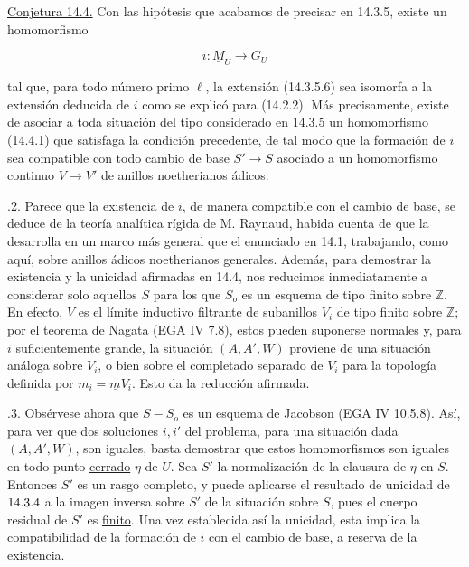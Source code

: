 
\par\medskip
\noindent
\underline{Conjetura 14.4.} Con las hipótesis que acabamos de precisar
en 14.3.5, existe un homomorfismo

\begin{equation}\tag{14.4.1}
 i:\underline M_U\longrightarrow G_U
\end{equation}

\noindent
tal que, para todo número primo $\ell$, la extensión (14.3.5.6) sea
isomorfa a la extensión deducida de $i$ como se explicó para (14.2.2).
Más precisamente, existe  de asociar a toda situación del tipo considerado en 14.3.5 un
homomorfismo (14.4.1) que satisfaga la condición precedente, de tal modo
que la formación de $i$ sea compatible con todo cambio de base
$S'\longrightarrow S$ asociado a un homomorfismo continuo
$V\longrightarrow V'$ de anillos noetherianos ádicos.

\medskip
{}.2. Parece que la existencia de $i$, de manera compatible con el
cambio de base, se deduce de la teoría analítica rígida de M. Raynaud,
habida cuenta de que la desarrolla en un marco más general que el
enunciado en 14.1, trabajando, como aquí, sobre anillos ádicos
noetherianos generales. Además, para demostrar la existencia y la
unicidad afirmadas en 14.4, nos reducimos inmediatamente a considerar
solo aquellos $S$ para los que $S_o$ es un esquema de tipo finito sobre
$\mathbb Z$. En efecto, $V$ es el límite inductivo filtrante de
subanillos $V_i$ de tipo finito sobre $\mathbb Z$; por el teorema de
Nagata (EGA IV 7.8), estos pueden suponerse normales y, para $i$
suficientemente grande, la situación $(A,A',W)$ proviene de una
situación análoga sobre $V_i$, o bien sobre el completado separado de
$V_i$ para la topología definida por
$m_i=\underline m V_i$. Esto da la reducción afirmada.


\medskip
{}.3. Obsérvese ahora que $S-S_o$ es un esquema de Jacobson
(EGA IV 10.5.8). Así, para ver que dos soluciones $i,i'$ del problema,
para una situación dada $(A,A',W)$, son iguales, basta demostrar que
estos homomorfismos son iguales en todo punto \underline{cerrado}
$\eta$ de $U$. Sea $S'$ la normalización de la clausura de $\eta$ en
$S$. Entonces $S'$ es un rasgo completo, y puede aplicarse el resultado
de unicidad de $\sisi{4.3}{14.3.4}$ a la imagen inversa sobre
$S'$ de la situación sobre $S$, pues el cuerpo residual de
$S'$ es \underline{finito}. Una vez establecida así la unicidad, esta
implica la compatibilidad de la formación de $i$ con el cambio de base,
a reserva de la existencia.

